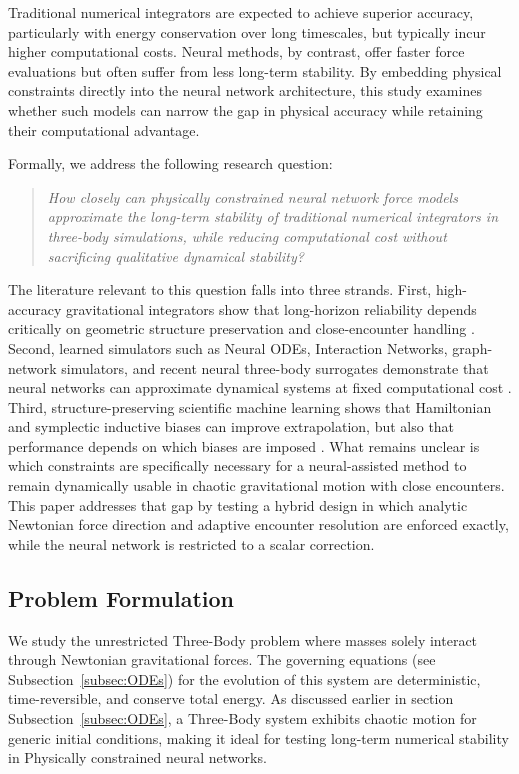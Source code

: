 \documentclass[12pt]{article}
\begin{document}
Traditional numerical integrators are expected to achieve superior accuracy, particularly with energy conservation over long timescales, but typically incur higher computational costs. Neural methods, by contrast, offer faster force evaluations but often suffer from less long-term stability. By embedding physical constraints directly into the neural network architecture, this study examines whether such models can narrow the gap in physical accuracy while retaining their computational advantage.

Formally, we address the following research question:
\begin{quote}
\emph{How closely can physically constrained neural network force models approximate the long-term stability of traditional numerical integrators in three-body simulations, while reducing computational cost without sacrificing qualitative dynamical stability?}
\end{quote}

The literature relevant to this question falls into three strands. First, high-accuracy gravitational integrators show that long-horizon reliability depends critically on geometric structure preservation and close-encounter handling \cite{hairer2006geometric,Rein_2015,Rein_2014,boekholt2015reliability}. Second, learned simulators such as Neural ODEs, Interaction Networks, graph-network simulators, and recent neural three-body surrogates demonstrate that neural networks can approximate dynamical systems at fixed computational cost \cite{chen2018neuralode,battaglia2016interaction,sanchez2020learning,breen2020newton}. Third, structure-preserving scientific machine learning shows that Hamiltonian and symplectic inductive biases can improve extrapolation, but also that performance depends on which biases are imposed \cite{greydanus2019hamiltonian,cranmer2020lagrangian,jin2020sympnets,gruver2022deconstructing,horn2025generalized}. What remains unclear is which constraints are specifically necessary for a neural-assisted method to remain dynamically usable in chaotic gravitational motion with close encounters. This paper addresses that gap by testing a hybrid design in which analytic Newtonian force direction and adaptive encounter resolution are enforced exactly, while the neural network is restricted to a scalar correction.


\subsection{Problem Formulation}
We study the unrestricted Three-Body problem where masses solely interact through Newtonian gravitational forces. The governing equations (see Subsection~\ref{subsec:ODEs}) for the evolution of this system are deterministic, time-reversible, and conserve total energy. As discussed earlier in section Subsection~\ref{subsec:ODEs}, a Three-Body system exhibits chaotic motion for generic initial conditions, making it ideal for testing long-term numerical stability in Physically constrained neural networks.
\end{document}
